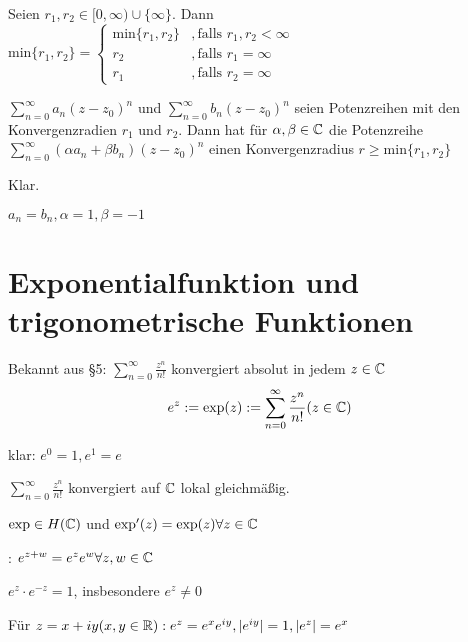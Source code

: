 \documentclass[a4paper,twoside,DIV15,BCOR12mm]{scrbook}
\begin{document}
\begin{definition}
Seien $r_1, r_2 \in [0, \infty) \cup \{\infty\}$. Dann \\
$ \text{min}\{r_1,r_2\} =\begin{cases}
		\text{min}\{r_1, r_2\} &, \text{falls } r_1,r_2 < \infty \\
		r_2 &, \text{falls } r_1 = \infty \\
		r_1 &, \text{falls } r_2 = \infty 
		\end{cases}$
\end{definition}
\begin{satz}
$\sum\limits_{n=0}^{\infty} a_n(z-z_0)^{n}$ und $\sum\limits_{n=0}^{\infty} b_n(z-z_0)^{n}$ seien Potenzreihen mit den Konvergenzradien $r_1$ und $r_2$. 
Dann hat für $\alpha, \beta \in \mathbb{C}$ die Potenzreihe $\sum\limits_{n=0}^{\infty} (\alpha a_n+\beta b_n)(z-z_0)^{n}$ einen Konvergenzradius $r \geq \text{min}\{r_1, r_2\}$
\end{satz}
\begin{beweis}
Klar.
\end{beweis}
\begin{beispiel}
$a_n = b_n, \alpha = 1, \beta = -1$
\end{beispiel}

\chapter{Exponentialfunktion und trigonometrische Funktionen}
Bekannt aus §5: $\sum_{n=0}^{\infty}\frac{z^n}{n!}$ konvergiert absolut in jedem $z \in \mathbb{C}$
$$ e^z := \exp(z):=\sum_{n=0}^{\infty}\frac{z^n}{n!} (z \in \mathbb{C})$$

klar: $e^0 = 1, e^1 = e$

\begin{satz} %
\begin{liste}
\item $\sum_{n=0}^{\infty}\frac{z^n}{n!}$ konvergiert auf $\mathbb{C}$ lokal gleichmäßig.
\item $\exp \in H(\mathbb{C} )$ und $\exp '(z) = \exp (z) \forall z \in \mathbb{C}$
\item {}: $ e^{z+w} = e^ze^w \forall z,w \in \mathbb{C}$
\item $e^z\cdot e^{-z} = 1$, insbesondere $e^z \neq 0$
\item Für $z = x + iy (x,y \in \mathbb{R}): e^z = e^xe^{iy}, |e^{iy}| = 1, |e^z| = e^x$
\end{liste}
\end{satz} 
\end{document}
